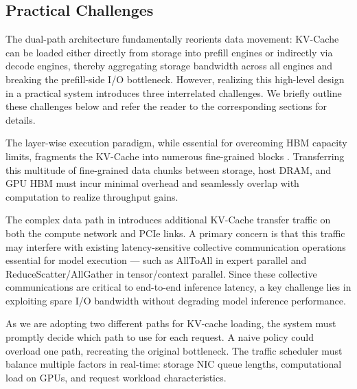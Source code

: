 \subsection{Practical Challenges}
\label{sec:system}

The dual-path architecture fundamentally reorients data movement: KV-Cache can be loaded either directly from storage into prefill engines or indirectly via decode engines, thereby aggregating storage bandwidth across all engines and breaking the prefill-side I/O bottleneck. However, realizing this high-level design in a practical system introduces three interrelated challenges. We briefly outline these challenges below and refer the reader to the corresponding sections for details.

The layer-wise execution paradigm, while essential for overcoming HBM capacity limits, fragments the KV-Cache into numerous fine-grained blocks \cite{ISCA24:Splitwise}. Transferring this multitude of fine-grained data chunks between storage, host DRAM, and GPU HBM must incur minimal overhead and seamlessly overlap with computation to realize throughput gains. 

The complex data path in \sysname introduces additional KV-Cache transfer traffic on both the compute network and PCIe links. A primary concern is that this traffic may interfere with existing latency-sensitive collective communication operations essential for model execution --- such as AllToAll in expert parallel \cite{DeepEP} and ReduceScatter/AllGather in tensor/context parallel. Since these collective communications are critical to end-to-end inference latency, a key challenge lies in exploiting spare I/O bandwidth without degrading model inference performance.

As we are adopting two different paths for KV-cache loading, the system must promptly decide which path to use for each request. A naive policy could overload one path, recreating the original bottleneck. The traffic scheduler must balance multiple factors in real-time: storage NIC queue lengths, computational load on GPUs, and request workload characteristics.


